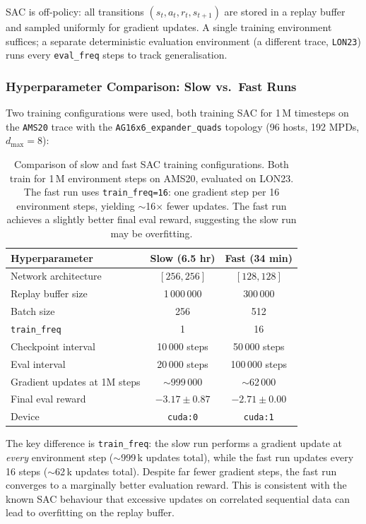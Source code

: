 \documentclass[11pt]{article}
\begin{document}
SAC is off-policy: all transitions $(s_t, a_t, r_t, s_{t+1})$ are stored in
a replay buffer and sampled uniformly for gradient updates.  A single
training environment suffices; a separate deterministic evaluation
environment (a different trace, \texttt{LON23}) runs every
\texttt{eval\_freq} steps to track generalisation.

\subsubsection*{Hyperparameter Comparison: Slow vs.\ Fast Runs}

Two training configurations were used, both training SAC for 1\,M timesteps
on the \texttt{AMS20} trace with the \texttt{AG16x6\_expander\_quads}
topology (96 hosts, 192 MPDs, $d_{\max}=8$):

\begin{table}[H]
\centering
\small
\renewcommand{\arraystretch}{1.3}
\begin{tabular}{lcc}
\toprule
\textbf{Hyperparameter} & \textbf{Slow (6.5 hr)} & \textbf{Fast (34 min)} \\
\midrule
Network architecture & $[256, 256]$ & $[128, 128]$ \\
Replay buffer size   & 1\,000\,000  & 300\,000 \\
Batch size           & 256          & 512 \\
\texttt{train\_freq} & 1            & 16 \\
Checkpoint interval  & 10\,000 steps & 50\,000 steps \\
Eval interval        & 20\,000 steps & 100\,000 steps \\
Gradient updates at 1M steps & $\sim$999\,000 & $\sim$62\,000 \\
Final eval reward    & $-3.17 \pm 0.87$ & $-2.71 \pm 0.00$ \\
Device               & \texttt{cuda:0}  & \texttt{cuda:1} \\
\bottomrule
\end{tabular}
\caption{Comparison of slow and fast SAC training configurations.  Both
train for 1\,M environment steps on AMS20, evaluated on LON23.  The fast
run uses \texttt{train\_freq=16}: one gradient step per 16 environment
steps, yielding $\sim$16$\times$ fewer updates.  The fast run achieves a
slightly better final eval reward, suggesting the slow run may be
overfitting.}
\label{tab:training_configs}
\end{table}

The key difference is \texttt{train\_freq}: the slow run performs a gradient
update at \emph{every} environment step ($\sim$999\,k updates total), while
the fast run updates every 16 steps ($\sim$62\,k updates total).  Despite
far fewer gradient steps, the fast run converges to a marginally better
evaluation reward.  This is consistent with the known SAC behaviour that
excessive updates on correlated sequential data can lead to overfitting
on the replay buffer.
\end{document}

